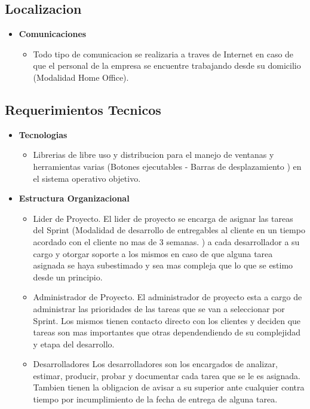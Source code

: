 \documentclass[
10pt, %
a4paper, %
oneside, %
headinclude,footinclude, %
BCOR5mm, %
]{scrartcl}
\begin{document}
\subsection{Localizacion}
\begin{itemize}
  \item \textbf {Comunicaciones}
  \begin{itemize}
    \item Todo tipo de comunicacion se realizaria a traves de Internet en caso
            de que el personal de la empresa se encuentre trabajando desde su
            domicilio (Modalidad Home Office).
  \end{itemize}
\end{itemize}

\subsection{Requerimientos Tecnicos}
\begin{itemize}
  \item \textbf {Tecnologias}
  \begin{itemize}
    \item Librerias de libre uso y distribucion para el manejo de ventanas
          y herramientas varias (Botones ejecutables - Barras de desplazamiento )
          en el sistema operativo objetivo.
  \end{itemize}

  \item \textbf {Estructura Organizacional}
  \begin{itemize}
    \item Lider de Proyecto.
            El lider de proyecto se encarga de asignar las tareas del
            Sprint (Modalidad de desarrollo de entregables al cliente en un
                     tiempo acordado con el cliente no mas de 3 semanas. )
            a cada desarrollador a su cargo y otorgar soporte a los mismos
            en caso de que alguna tarea asignada se haya subestimado y sea
            mas compleja que lo que se estimo desde un principio.
    \item Administrador de Proyecto.
            El administrador de proyecto esta a cargo de administrar las
            prioridades de las tareas que se van a seleccionar por Sprint.
            Los mismos tienen contacto directo con los clientes y deciden
            que tareas son mas importantes que otras dependendiendo de su
            complejidad y etapa del desarrollo.
    \item Desarrolladores
            Los desarrolladores son los encargados de analizar, estimar,
            producir, probar y documentar cada tarea que se le es asignada.
            Tambien tienen la obligacion de avisar a su superior ante cualquier
            contra tiempo por incumplimiento de la fecha de entrega de alguna tarea.
  \end{itemize}
\end{itemize}
\end{document}
